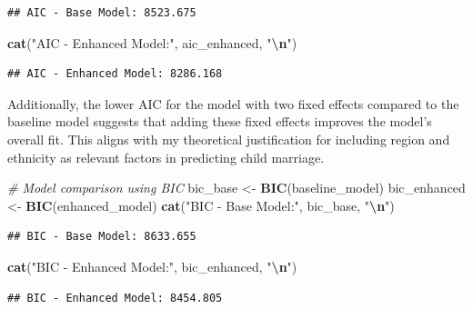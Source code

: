 \documentclass[
]{article}
\newenvironment{Shaded}{\begin{snugshade}}{\end{snugshade}}
\newcommand{\CommentTok}[1]{\textcolor[rgb]{0.56,0.35,0.01}{\textit{#1}}}
\newcommand{\FunctionTok}[1]{\textcolor[rgb]{0.13,0.29,0.53}{\textbf{#1}}}
\newcommand{\NormalTok}[1]{#1}
\newcommand{\OtherTok}[1]{\textcolor[rgb]{0.56,0.35,0.01}{#1}}
\newcommand{\SpecialCharTok}[1]{\textcolor[rgb]{0.81,0.36,0.00}{\textbf{#1}}}
\newcommand{\StringTok}[1]{\textcolor[rgb]{0.31,0.60,0.02}{#1}}
\begin{document}
\begin{verbatim}
## AIC - Base Model: 8523.675
\end{verbatim}

\begin{Shaded}
\begin{Highlighting}[]
\FunctionTok{cat}\NormalTok{(}\StringTok{"AIC {-} Enhanced Model:"}\NormalTok{, aic\_enhanced, }\StringTok{"}\SpecialCharTok{\textbackslash{}n}\StringTok{"}\NormalTok{)}
\end{Highlighting}
\end{Shaded}

\begin{verbatim}
## AIC - Enhanced Model: 8286.168
\end{verbatim}

Additionally, the lower AIC for the model with two fixed effects
compared to the baseline model suggests that adding these fixed effects
improves the model's overall fit. This aligns with my theoretical
justification for including region and ethnicity as relevant factors in
predicting child marriage.

\begin{Shaded}
\begin{Highlighting}[]
\CommentTok{\# Model comparison using BIC}
\NormalTok{bic\_base }\OtherTok{\textless{}{-}} \FunctionTok{BIC}\NormalTok{(baseline\_model)}
\NormalTok{bic\_enhanced }\OtherTok{\textless{}{-}} \FunctionTok{BIC}\NormalTok{(enhanced\_model)}
\FunctionTok{cat}\NormalTok{(}\StringTok{"BIC {-} Base Model:"}\NormalTok{, bic\_base, }\StringTok{"}\SpecialCharTok{\textbackslash{}n}\StringTok{"}\NormalTok{)}
\end{Highlighting}
\end{Shaded}

\begin{verbatim}
## BIC - Base Model: 8633.655
\end{verbatim}

\begin{Shaded}
\begin{Highlighting}[]
\FunctionTok{cat}\NormalTok{(}\StringTok{"BIC {-} Enhanced Model:"}\NormalTok{, bic\_enhanced, }\StringTok{"}\SpecialCharTok{\textbackslash{}n}\StringTok{"}\NormalTok{)}
\end{Highlighting}
\end{Shaded}

\begin{verbatim}
## BIC - Enhanced Model: 8454.805
\end{verbatim}
\end{document}
